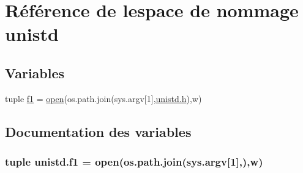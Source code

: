\hypertarget{namespaceunistd}{}\section{Référence de l\textquotesingle{}espace de nommage unistd}
\label{namespaceunistd}
\subsection*{Variables}
\begin{DoxyCompactItemize}
\item 
tuple \hyperlink{namespaceunistd_ab861ca7fae2c206098c40ae033e9da8b}{f1} = \hyperlink{structcmd_8h_a2c4414339f388561554c2deab11a1a07}{open}(os.\+path.\+join(sys.\+argv\mbox{[}1\mbox{]},\textquotesingle{}\hyperlink{060__command__switch_8tcl_af96fd0966e32a310a0778d2e5c357700}{unistd.\+h}\textquotesingle{}),\textquotesingle{}w\textquotesingle{})
\end{DoxyCompactItemize}


\subsection{Documentation des variables}
\hypertarget{namespaceunistd_ab861ca7fae2c206098c40ae033e9da8b}{}
\subsubsection[{f1}]{\setlength{\rightskip}{0pt plus 5cm}tuple unistd.\+f1 = {\bf open}(os.\+path.\+join(sys.\+argv\mbox{[}1\mbox{]},\textquotesingle{}),\textquotesingle{}w\textquotesingle{})}\label{namespaceunistd_ab861ca7fae2c206098c40ae033e9da8b}
